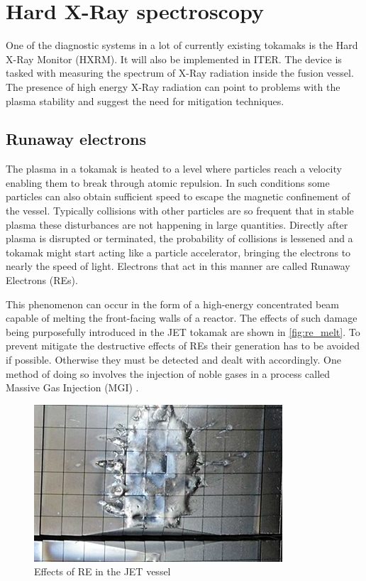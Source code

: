 \section{Hard X-Ray spectroscopy}

One of the diagnostic systems in a lot of currently existing tokamaks
is the Hard X-Ray Monitor (HXRM). It will also be implemented in ITER.
The device is tasked with measuring the spectrum of X-Ray radiation
inside the fusion vessel. The presence of high energy X-Ray
radiation can point to problems with the plasma stability and suggest the 
need for mitigation techniques.
\cite{low_noise_amplifier_for_pmt}

\subsection{Runaway electrons}

The plasma in a tokamak is heated to a level where particles reach a velocity
enabling them to break through atomic repulsion. In such conditions some 
particles can also obtain sufficient speed to escape the magnetic confinement
of the vessel. Typically collisions with other particles are so frequent
that in stable plasma these disturbances are not happening in large quantities.
Directly after plasma is disrupted or terminated, 
the probability of collisions is lessened 
and a tokamak might start acting like a particle accelerator,
bringing the electrons to nearly the speed of light.
Electrons that act in this manner are called Runaway Electrons (REs).
\cite{iter_re_melt}


This phenomenon can occur in the form of a high-energy 
concentrated beam capable of melting the front-facing walls of a reactor.
The effects of such damage being purposefully introduced in the JET tokamak
are shown in \autoref{fig:re_melt}. To prevent mitigate the destructive
effects of REs their generation has to be avoided if possible. Otherwise
they must be detected and dealt with accordingly. One method of doing so 
involves the injection of noble gases in a process called 
Massive Gas Injection (MGI) \cite{massive_gas_injection}.
\begin{figure}[h]
  \centering
  \includegraphics[width=.7\linewidth]{media/re_melt.jpeg}
  \caption{Effects of RE in the JET vessel\cite{iter_re_melt}}
  \label{fig:re_melt}
\end{figure}


